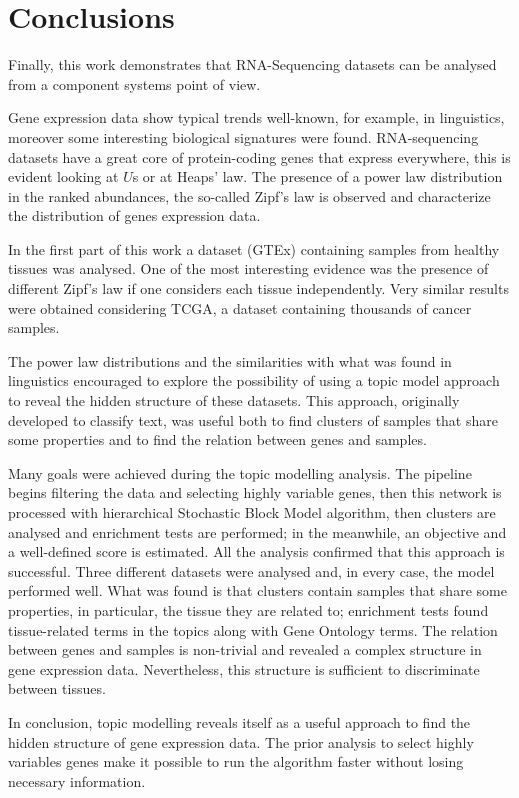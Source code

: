 \chapter{Conclusions}\label{ch:conclusions}
Finally, this work demonstrates that RNA-Sequencing datasets can be analysed from a component systems point of view.

Gene expression data show typical trends well-known, for example, in linguistics, moreover some interesting biological signatures were found. RNA-sequencing datasets have a great core of protein-coding genes that express everywhere, this is evident looking at $U$s or at Heaps' law. The presence of a power law distribution in the ranked abundances, the so-called Zipf's law is observed and characterize the distribution of genes expression data.

In the first part of this work a dataset (GTEx) containing samples from healthy tissues was analysed. One of the most interesting evidence was the presence of different Zipf's law if one considers each tissue independently. Very similar results were obtained considering TCGA, a dataset containing thousands of cancer samples.

The power law distributions and the similarities with what was found in linguistics encouraged to explore the possibility of using a topic model approach to reveal the hidden structure of these datasets. This approach, originally developed to classify text, was useful both to find clusters of samples that share some properties and to find the relation between genes and samples.

Many goals were achieved during the topic modelling analysis. The pipeline begins filtering the data and selecting highly variable genes, then this network is processed with hierarchical Stochastic Block Model algorithm, then clusters are analysed and enrichment tests are performed; in the meanwhile, an objective and a well-defined score is estimated. All the analysis confirmed that this approach is successful. Three different datasets were analysed and, in every case, the model performed well. What was found is that clusters contain samples that share some properties, in particular, the tissue they are related to; enrichment tests found tissue-related terms in the topics along with Gene Ontology terms. The relation between genes and samples is non-trivial and revealed a complex structure in gene expression data. Nevertheless, this structure is sufficient to discriminate between tissues.

In conclusion, topic modelling reveals itself as a useful approach to find the hidden structure of gene expression data. The prior analysis to select highly variables genes make it possible to run the algorithm faster without losing necessary information.

